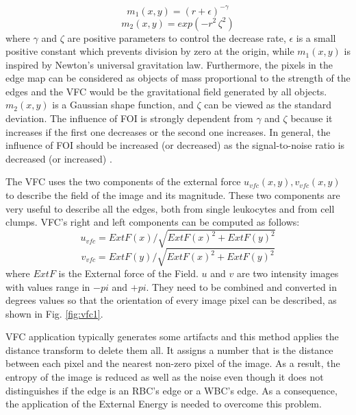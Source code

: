 \documentclass[final,a4paper,12pt,english]{UnicaPhdThesis3}
\begin{document}
{\begin{equation}
{m} _{1} ( x,y ) =(r+\epsilon) ^{-\gamma}
\end{equation}
\begin{equation}
{m} _{2} ( x,y ) =exp(-r^{2}\, \zeta ^{2})
\end{equation}
where $\gamma$ and $\zeta$ are positive parameters to control the decrease rate, $\epsilon$ is a small positive constant which prevents division by zero at the origin, while ${m} _{1} ( x,y )$ is inspired by Newton's universal gravitation law. Furthermore, the pixels in the edge map can be considered as objects of mass proportional to the strength of the edges and the VFC would be the gravitational field generated by all objects. 
${m} _{2} ( x,y )$ is a Gaussian shape function, and $\zeta$ can be viewed as the standard deviation.
The influence of FOI is strongly dependent from $\gamma$ and $\zeta$ because it increases if the first one decreases or the second one increases. 
In general, the influence of FOI should be increased (or decreased) as the signal-to-noise ratio is decreased (or increased) \cite{Bing}.

The VFC uses the two components of the external force ${u} _{vfc} ( x,y ) , {v} _{vfc} (x,y)$ to describe the field of the image and its magnitude. These two components are very useful to describe all the edges, both from single leukocytes and from cell clumps. VFC's right and left components can be computed as follows:
\begin{equation}
{u} _{vfc}=ExtF(x)/\sqrt{ExtF(x)^{2} + ExtF(y)^{2}}
\end{equation}
\begin{equation}
{v} _{vfc}=ExtF(y)/\sqrt{ExtF(x)^{2} + ExtF(y)^{2}}
\end{equation}
where $ExtF$ is the External force of the Field. $u$ and $v$ are two intensity images with values range in $-pi$ and $+pi$. They need to be combined and converted in degrees values so that the orientation of every image pixel can be described, as shown in Fig. \ref{fig:vfc1}. 

VFC application typically generates some artifacts and this method applies the distance transform to delete them all. It assigns a number that is the distance between each pixel and the nearest non-zero pixel of the image. As a result, the entropy of the image is reduced as well as the noise even though it does not distinguishes if the edge is an RBC's edge or a WBC's edge. As a consequence, the application of the External Energy is needed to overcome this problem.

}
\end{document}
